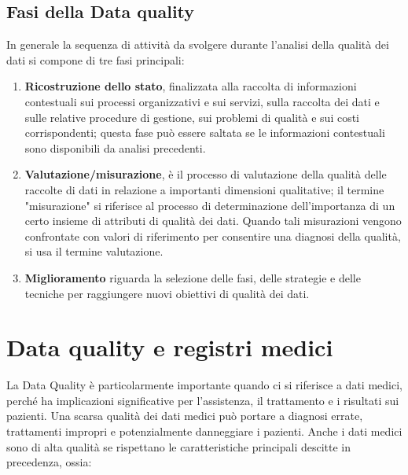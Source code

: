 \subsection{Fasi della Data quality}

In generale la sequenza di attività da svolgere durante l'analisi della qualità dei dati si compone di tre fasi principali:
\begin{enumerate}
	\item \textbf{Ricostruzione dello stato}, finalizzata alla raccolta di informazioni contestuali sui processi organizzativi e sui servizi, sulla raccolta dei dati e sulle relative procedure di gestione, sui problemi di qualità e sui costi corrispondenti; questa fase può essere saltata se le informazioni contestuali sono disponibili da analisi precedenti.
	\item \textbf{Valutazione/misurazione}, è il processo di valutazione della qualità delle raccolte di dati in relazione a importanti dimensioni qualitative; il termine "misurazione" si riferisce al processo di determinazione dell'importanza di un certo insieme di attributi di qualità dei dati. Quando tali misurazioni vengono confrontate con valori di riferimento per consentire una diagnosi della qualità, si usa il termine valutazione.
	\item \textbf{Miglioramento }riguarda la selezione delle fasi, delle strategie e delle tecniche per raggiungere nuovi obiettivi di qualità dei dati\cite{batini2009methodologies}.
\end{enumerate}




\section{Data quality e registri medici}

La Data Quality è particolarmente importante quando ci si riferisce a dati medici, perché ha implicazioni significative per l'assistenza, il trattamento e i risultati sui pazienti. Una scarsa qualità dei dati medici può portare a diagnosi errate, trattamenti impropri e potenzialmente danneggiare i pazienti.
Anche i dati medici sono di alta qualità se rispettano le caratteristiche principali descitte in precedenza, ossia:

